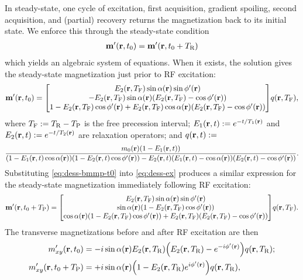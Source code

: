 In steady-state,
one cycle of excitation,
first acquisition, 
gradient spoiling,
second acquisition,
and (partial) recovery
returns the magnetization
back to its initial state.
We enforce this
through the steady-state condition
\begin{align}
	\bmmp\prtz = \bmmp\paren{\bmr,t_0+\TR}
	\label{eq:dess-ss}
\end{align}	
which yields an algebraic system of equations.
When it exists, 
the solution gives 
the steady-state magnetization
just prior to RF excitation:
\begin{align}
	\bmmp\prtz =
	\begin{bmatrix}
		\EtRP \sin{\flip\pr} \sin{\php\pr} \\
		-\EtRP \sin{\flip\pr} \paren{\EtRP-\cos{\php\pr}} \\
		1-\EtRP\cos{\php\pr} + \EtRP \cos{\flip\pr} \paren{\EtRP-\cos{\php\pr}}
	\end{bmatrix}
	q\paren{\bmr,\TFP},
	\label{eq:dess-bmmp-t0}
\end{align}
where 
$T_{\mathrm{F}} := T_\mathrm{R}-T_\mathrm{P}$ 
is the free precession interval;
$\Eo\paren{\bmr,t} := e^{-t/\To\pr}$ and 
$\Et\paren{\bmr,t} := e^{-t/\Tt\pr}$
are relaxation operators;
and 
$q\paren{\bmr,t} := $
$$
\frac{\mzero\pr \paren{1-\Eo\prt}
}{\paren{1-\Eo\prt\cos\flip\pr} \paren{1-\Et\prt\cos\php\pr} -
\Et\prt \paren{\Eo\prt - \cos\flip\pr} \paren{\Et\prt - \cos\php\pr}}.
$$
Substituting \eqref{eq:dess-bmmp-t0} 
into \eqref{eq:dess-ex}
produces a similar expression 
for the steady-state magnetization
immediately following RF excitation:
\begin{align}
	\bmmp\paren{\bmr,t_0+\TP} =
	\begin{bmatrix}
		\EtRP \sin{\flip\pr} \sin{\php\pr} \\
		\sin{\flip\pr} \paren{1 - \EtRP \cos{\php\pr}} \\
		\cos{\flip\pr} \paren{1 - \EtRP \cos{\php\pr}} + \EtRP \paren{\EtRP - \cos{\php\pr}}
	\end{bmatrix}
	q\paren{\bmr,\TFP}.
	\label{eq:dess-bmmp-tp}
\end{align}
The transverse magnetizations
before and after RF excitation are then
\begin{align}
	\mxyp\prtz &= 
		-i\sin{\flip\pr} \EtR \paren{\EtR-e^{-i\php\pr}} q\paren{\bmr,\TR}
		\label{eq:dess-mxyp-t0}; \\
	\mxyp\paren{\bmr,t_0+\TP} &=
		+i\sin{\flip\pr} \paren{1-\EtR e^{i\php\pr}} q\paren{\bmr,\TR},
		\label{eq:dess-mxyp-tp}
\end{align}

